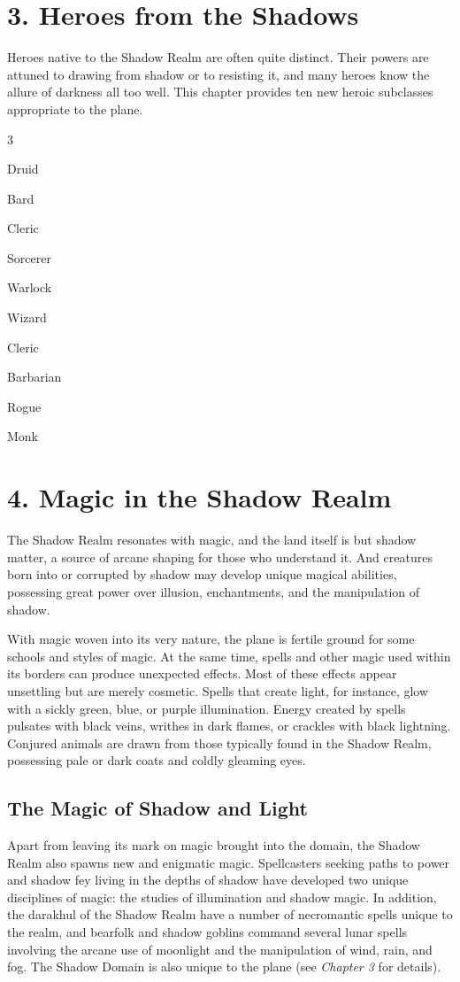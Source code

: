 \documentclass[10pt,a4paper,twoside,bg=print,twocolumn,openany,nodeprecatedcode]{dndbook}
\begin{document}
\chapter{3. Heroes from the Shadows}
Heroes native to the Shadow Realm are often quite distinct. Their powers are attuned to drawing from shadow or to resisting it, and many heroes know the allure of darkness all too well. This chapter provides ten new heroic subclasses appropriate to the plane.


\begin{itemize}
\begin{multicols}{3}
\item Druid
\item Bard
\item Cleric
\item Sorcerer
\item Warlock
\item Wizard
\item Cleric
\item Barbarian
\item Rogue
\item Monk
\end{multicols}

\end{itemize}

\chapter{4. Magic in the Shadow Realm}
The Shadow Realm resonates with magic, and the land itself is but shadow matter, a source of arcane shaping for those who understand it. And creatures born into or corrupted by shadow may develop unique magical abilities, possessing great power over illusion, enchantments, and the manipulation of shadow.

With magic woven into its very nature, the plane is fertile ground for some schools and styles of magic. At the same time, spells and other magic used within its borders can produce unexpected effects. Most of these effects appear unsettling but are merely cosmetic. Spells that create light, for instance, glow with a sickly green, blue, or purple illumination. Energy created by spells pulsates with black veins, writhes in dark flames, or crackles with black lightning. Conjured animals are drawn from those typically found in the Shadow Realm, possessing pale or dark coats and coldly gleaming eyes.

\section{The Magic of Shadow and Light}
Apart from leaving its mark on magic brought into the domain, the Shadow Realm also spawns new and enigmatic magic. Spellcasters seeking paths to power and shadow fey living in the depths of shadow have developed two unique disciplines of magic: the studies of illumination and shadow magic. In addition, the darakhul of the Shadow Realm have a number of necromantic spells unique to the realm, and bearfolk and shadow goblins command several lunar spells involving the arcane use of moonlight and the manipulation of wind, rain, and fog. The Shadow Domain is also unique to the plane (see \textit{Chapter 3} for details).
\end{document}
